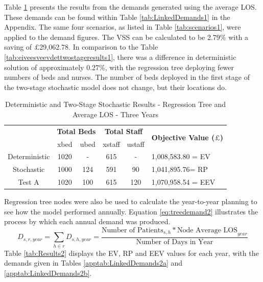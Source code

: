 \documentclass[../thesis.tex]{subfiles}
\begin{document}
Table \ref{tab:Results1} presents the results from the demands generated using the average LOS. These demands can be found within Table \ref{tab:LinkedDemands1} in the Appendix. The same four scenarios, as listed in Table \ref{tab:scenarios1}, were applied to the demand figures. The VSS can be calculated to be 2.79\% with a saving of $\pounds$29,062.78. In comparison to the Table \ref{tab:eiveesveevdettwostageresults1}, there was a difference in deterministic solution of approximately 0.27\%, with the regression tree deploying fewer numbers of beds and nurses. The number of beds deployed in the first stage of the two-stage stochastic model does not change, but their locations do. %

\begin{table}[h!]
    \centering
    \begin{tabular}{cccccl}\toprule
 & \multicolumn{2}{l}{\textbf{Total Beds}} & \multicolumn{2}{c}{\textbf{Total Staff}} & \multirow{2}{*}{\textbf{Objective Value ($\pounds$)}}\\ \cmidrule(lr){2-3} \cmidrule(lr){4-5}
 & xbed           & ubed          & xstaff         & ustaff         \\ \midrule
    Deterministic      & 1020 & - & 615 & - & 1,008,583.80 = EV \\ \midrule
    Stochastic &1000& 124& 591 & 90&  1,041,895.76= RP \\ \midrule
    Test A & 1020 & 100 & 615 & 120 & 1,070,958.54 = EEV \\\bottomrule
    \end{tabular}
    \caption{Deterministic and Two-Stage Stochastic Results - Regression Tree and Average LOS - Three Years}
    \label{tab:Results1}
\end{table}

Regression tree nodes were also be used to calculate the year-to-year planning to see how the model performed annually. Equation \eqref{eq:treedemand2} illustrates the process by which each annual demand was produced.
\begin{equation}\label{eq:treedemand2}
        D_{s,r,year} = \sum\limits_{h \in r} D_{s,h,year} = \frac{\text{Number of Patients}_{s,h}* {\text{Node Average LOS}}_{year}}{\text{Number of Days in Year}}
\end{equation}
Table \ref{tab:Results2} displays the EV, RP and EEV values for each year, with the demands given in Tables \ref{apptab:LinkedDemands2a} and \ref{apptab:LinkedDemands2b}.
\end{document}
